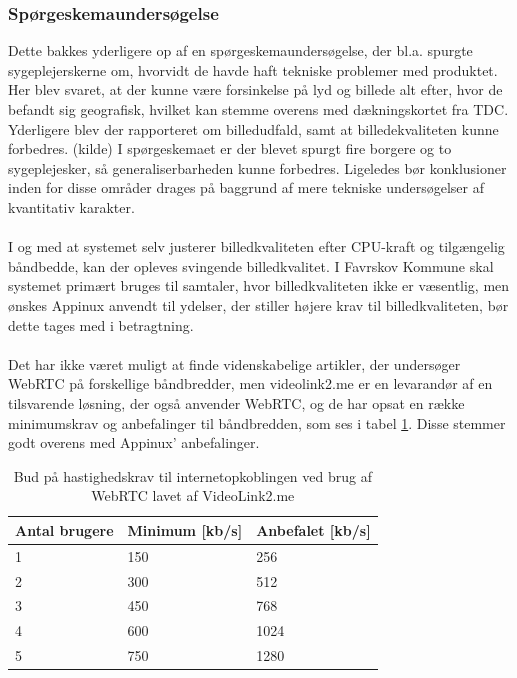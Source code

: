\subsubsection{Spørgeskemaundersøgelse}
Dette bakkes yderligere op af en spørgeskemaundersøgelse, der bl.a. spurgte sygeplejerskerne om, hvorvidt de havde haft tekniske problemer med produktet. Her blev svaret, at der kunne være forsinkelse på lyd og billede alt efter, hvor de befandt sig geografisk, hvilket kan stemme overens med dækningskortet fra TDC.\\Yderligere blev der rapporteret om billedudfald, samt at billedekvaliteten kunne forbedres. (kilde) I spørgeskemaet er der blevet spurgt fire borgere og to sygeplejesker, så generaliserbarheden kunne forbedres. Ligeledes bør konklusioner inden for disse områder drages på baggrund af mere tekniske undersøgelser af kvantitativ karakter.\\ \\
I og med at systemet selv justerer billedkvaliteten efter CPU-kraft og tilgængelig båndbedde, kan der opleves svingende billedkvalitet. I Favrskov Kommune skal systemet primært bruges til samtaler, hvor billedkvaliteten ikke er væsentlig, men ønskes Appinux anvendt til ydelser, der stiller højere krav til billedkvaliteten, bør dette tages med i betragtning.
\\ \\
Det har ikke været muligt at finde videnskabelige artikler, der undersøger WebRTC på forskellige båndbredder, men videolink2.me er en levarandør af en tilsvarende løsning, der også anvender WebRTC, og de har opsat en række minimumskrav og anbefalinger til båndbredden, som ses i tabel \ref{tab:hastighedtabel}. Disse stemmer godt overens med Appinux' anbefalinger.
\begin{table}[H]
\caption{Bud på hastighedskrav til internetopkoblingen ved brug af WebRTC lavet af VideoLink2.me \parencite{videolink2me}}
\label{tab:hastighedtabel}
\centering
\begin{tabular}{|l|l|l|}
\hline
\cellcolor{blue!25}\textbf{Antal brugere} & \cellcolor{blue!25}\textbf{Minimum} [kb/s]  & \cellcolor{blue!25}\textbf{Anbefalet}  [kb/s] \\ \hline
1             & 150          & 256          \\ \hline
2             & 300          & 512          \\ \hline
3             & 450          & 768          \\ \hline
4             & 600          & 1024          \\ \hline
5             & 750          & 1280          \\ \hline
\end{tabular}

\end{table}
